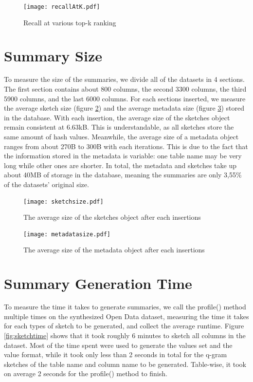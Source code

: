 \begin{figure}[ht]
    \centering
    \texttt{[image: recallAtK.pdf]}
    \caption{Recall at various top-k ranking}
    \label{fig:recallAtK}
\end{figure}


\section{Summary Size}\label{summarySizeTest}

To measure the size of the summaries, we divide all of the datasets in 4 sections. The first section contains about 800 columns, the second 3300 columns, the third 5900 columns, and the last 6000 columns. For each sections inserted, we measure the average sketch size (figure \ref{fig:sketchsize}) and the average metadata size (figure \ref{fig:metadatasize}) stored in the database. With each insertion, the average size of the sketches object remain consistent at 6.63kB. This is understandable, as all sketches store the same amount of hash values. Meanwhile, the average size of a metadata object ranges from about 270B to 300B with each iterations. This is due to the fact that the information stored in the metadata is variable: one table name may be very long while other ones are shorter. In total, the metadata and sketches take up about 40MB of storage in the database, meaning the summaries are only 3,55\% of the datasets' original size.

\begin{figure}[ht]
    \centering
    \texttt{[image: sketchsize.pdf]}
    \caption{The average size of the sketches object after each insertions}
    \label{fig:sketchsize}
\end{figure}

\begin{figure}[ht]
    \centering
    \texttt{[image: metadatasize.pdf]}
    \caption{The average size of the metadata object after each insertions}
    \label{fig:metadatasize}
\end{figure}

\section{Summary Generation Time}

To measure the time it takes to generate summaries, we call the profile() method multiple times on the synthesized Open Data dataset, measuring the time it takes for each types of sketch to be generated, and collect the average runtime. Figure \ref{fig:sketchtime} shows that it took roughly 6 minutes to sketch all columns in the dataset. Most of the time spent were used to generate the values set and the value format, while it took only less than 2 seconds in total for the q-gram sketches of the table name and column name to be generated. Table-wise, it took on average 2 seconds for the profile() method to finish.

